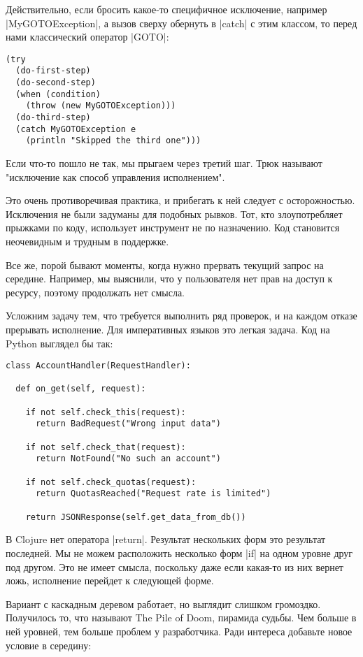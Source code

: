 Действительно, если бросить какое-то специфичное исключение, например
\spverb|MyGOTOException|, а вызов сверху обернуть в \spverb|catch| с этим классом, то перед
нами классический оператор \spverb|GOTO|:

\begin{verbatim}
(try
  (do-first-step)
  (do-second-step)
  (when (condition)
    (throw (new MyGOTOException)))
  (do-third-step)
  (catch MyGOTOException e
    (println "Skipped the third one")))
\end{verbatim}

Если что-то пошло не так, мы прыгаем через третий шаг. Трюк называют "исключение
как способ управления исполнением".

Это очень противоречивая практика, и прибегать к ней следует с
осторожностью. Исключения не были задуманы для подобных рывков. Тот, кто
злоупотребляет прыжками по коду, использует инструмент не по назначению. Код
становится неочевидным и трудным в поддержке.

Все же, порой бывают моменты, когда нужно прервать текущий запрос на
середине. Например, мы выяснили, что у пользователя нет прав на доступ к
ресурсу, поэтому продолжать нет смысла.

Усложним задачу тем, что требуется выполнить ряд проверок, и на каждом отказе
прерывать исполнение. Для императивных языков это легкая задача. Код на Python
выглядел бы так:

\begin{verbatim}
class AccountHandler(RequestHandler):

  def on_get(self, request):

    if not self.check_this(request):
      return BadRequest("Wrong input data")

    if not self.check_that(request):
      return NotFound("No such an account")

    if not self.check_quotas(request):
      return QuotasReached("Request rate is limited")

    return JSONResponse(self.get_data_from_db())
\end{verbatim}

В Clojure нет оператора \spverb|return|. Результат нескольких форм это результат
последней. Мы не можем расположить несколько форм \spverb|if| на одном уровне друг под
другом. Это не имеет смысла, поскольку даже если какая-то из них вернет ложь,
исполнение перейдет к следующей форме.

Вариант с каскадным деревом работает, но выглядит слишком громоздко. Получилось
то, что называют The Pile of Doom, пирамида судьбы. Чем больше в ней уровней,
тем больше проблем у разработчика. Ради интереса добавьте новое условие в
середину:

